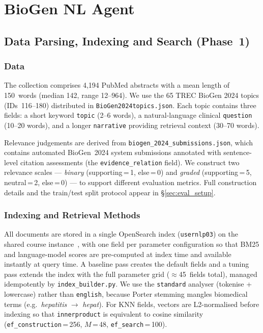 
\section{BioGen NL Agent}
\label{sec:biogen}

\subsection{Data Parsing, Indexing and Search (Phase~1)}
\label{sec:phase1}

\subsubsection{Data}

The collection comprises 4{,}194 PubMed abstracts with a mean length of
150~words (median 142, range 12--964).
We use the 65 TREC BioGen 2024 topics (IDs~116--180) distributed in
\texttt{BioGen2024topics.json}.  Each topic contains three fields:
a short keyword \texttt{topic} (2--6 words), a natural-language clinical
\texttt{question} (10--20 words), and a longer \texttt{narrative} providing
retrieval context (30--70 words).

Relevance judgements are derived from
\texttt{biogen\_2024\_\allowbreak submissions\allowbreak .json},
which contains automated BioGen~2024 system submissions annotated with
sentence-level citation assessments (the \texttt{evidence\_relation} field).
We construct two relevance scales --- \emph{binary}
(supporting\,=\,1, else\,=\,0) and \emph{graded}
(supporting\,=\,5, neutral\,=\,2, else\,=\,0) --- to support
different evaluation metrics.  Full construction details and the
train/test split protocol appear in §\ref{sec:eval_setup}.

\subsubsection{Indexing and Retrieval Methods}

All documents are stored in a single OpenSearch index
(\texttt{usernlp03}) on the shared course instance~\cite{opensearch},
with one field per parameter configuration so that BM25 and
language-model scores are pre-computed at index time and available
instantly at query time.
A baseline pass creates the default fields and a tuning pass extends the
index with the full parameter grid ($\approx$45~fields total), managed
idempotently by \texttt{index\_builder.py}.
We use the \texttt{standard} analyser (tokenise + lowercase) rather than
\texttt{english}, because Porter stemming mangles biomedical terms
(e.g.\ \emph{hepatitis} $\to$ \emph{hepat}).
For KNN fields, vectors are L2-normalised before indexing so that
\texttt{innerproduct} is equivalent to cosine similarity
(\texttt{ef\_construction}\,=\,256, $M$\,=\,48,
\texttt{ef\_search}\,=\,100).

